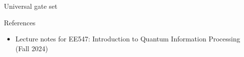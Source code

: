 \documentclass[9pt]{beamer}
\begin{document}
\begin{section}{Universal gate set}
\begin{frame}
\begin{itemize}
            \end{itemize}
        \end{frame}

    \end{section}


    \begin{frame}{References}
        
        \begin{itemize}
            \item Lecture notes for EE547: Introduction to Quantum Information Processing (Fall 2024)
        \end{itemize}
        \vspace{6cm}
    \end{frame}
\end{document}

